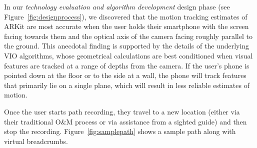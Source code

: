 \documentclass[chi_draft]{sigchi}
\newcommand{\OM}{O\&M\xspace}
\begin{document}
In our \emph{technology evaluation and algorithm development} design phase (see Figure~\ref{fig:designprocess}), we discovered that the motion tracking estimates of ARKit are most accurate when the user holds their smartphone with the screen facing towards them and the optical axis of the camera facing roughly parallel to the ground.  This anecdotal finding is supported by the details of the underlying VIO algorithms, whose  geometrical calculations are best conditioned when visual features are tracked at a range of depths from the camera.  If the user's phone is pointed down at the floor or to the side at a wall, the phone will track features that primarily lie on a single plane, which will result in less reliable estimates of motion.

Once the user starts path recording, they travel to a new location (either via their traditional \OM process or via assistance from a sighted guide) and then stop the recording.  Figure~\ref{fig:samplepath} shows a sample path along with virtual breadcrumbs.
%
\end{document}
